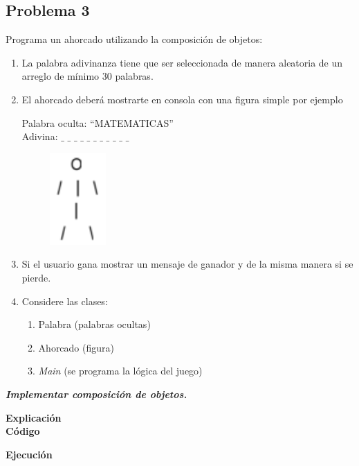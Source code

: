 \documentclass[11pt, twocolumn]{article}
\newcommand{\linejump}{\hfill \break}
\begin{document}
  \subsection*{Problema 3}
  Programa un ahorcado utilizando la composición de objetos:
  \begin{enumerate}[label=\alph*.]
    \item La palabra adivinanza tiene que ser seleccionada de manera aleatoria de un arreglo de mínimo 30 palabras.
    \item El ahorcado deberá mostrarte en consola con una figura simple por ejemplo
    
    Palabra oculta: “MATEMATICAS” \\
    Adivina: $\_$ $\_$ $\_$ $\_$ $\_$ $\_$ $\_$ $\_$ $\_$ $\_$ $\_$

    \begin{figure}[ht]
      \includegraphics[width=0.15\columnwidth, center]{ahorcado.png}
    \end{figure}
    \item Si el usuario gana mostrar un mensaje de ganador y de la misma manera si se pierde.
    \item Considere las clases:
    \begin{enumerate}[label=\roman*.]
      \item Palabra (palabras ocultas)
      \item Ahorcado (figura)
      \item \textit{Main} (se programa la lógica del juego)
    \end{enumerate}
  \end{enumerate}

  \textbf{\textit{Implementar composición de objetos.}}

  \linejump
  \textbf{Explicación} \\


  \textbf{Código}
    

  \textbf{Ejecución}
\end{document}
